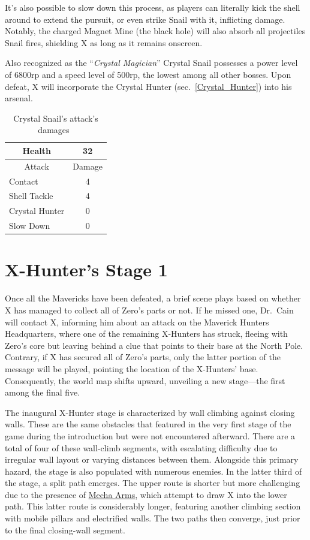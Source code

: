  It's also possible to slow down this process, as players can literally kick the shell around to extend the pursuit, or even strike Snail with it, inflicting damage. Notably, the charged Magnet Mine (the black hole) will also absorb all projectiles Snail fires, shielding X as long as it remains onscreen.

Also recognized as the ``\textit{Crystal Magician}'' Crystal Snail possesses a power level of 6800rp and a speed level of 500rp, the lowest among all other bosses. Upon defeat, X will incorporate the Crystal Hunter (sec.~\ref{Crystal_Hunter}) into his arsenal.
\begin{table}[htp]
	\centering
	\begin{tabular}[h]{l c}
		\toprule
		\multicolumn{1}{c}{Health}  & 32 \\
		\midrule
		\multicolumn{1}{c}{Attack} & \multicolumn{1}{c}{Damage}\\
		Contact & 4 \\
		Shell Tackle & 4\\
		Crystal Hunter & 0\\
		Slow Down & 0\\
		\bottomrule
	\end{tabular}
	\caption{Crystal Snail's attack's damages~\cite{wiki:Crystal_snail,book:Compendium}}
\end{table}

\section{X-Hunter's Stage 1}

Once all the Mavericks have been defeated, a brief scene plays based on whether X has managed to collect all of Zero's parts or not. If he missed one, Dr.~Cain will contact X, informing him about an attack on the Maverick Hunters Headquarters, where one of the remaining X-Hunters has struck, fleeing with Zero's core but leaving behind a clue that points to their base at the North Pole. Contrary, if X has secured all of Zero's parts, only the latter portion of the message will be played, pointing the location of the X-Hunters' base. Consequently, the world map shifts upward, unveiling a new stage—the first among the final five.

The inaugural X-Hunter stage is characterized by wall climbing against closing walls. These are the same obstacles that featured in the very first stage of the game during the introduction but were not encountered afterward. There are a total of four of these wall-climb segments, with escalating difficulty due to irregular wall layout or varying distances between them. Alongside this primary hazard, the stage is also populated with numerous enemies. In the latter third of the stage, a split path emerges. The upper route is shorter but more challenging due to the presence of \hyperlink{enem:Mecha-Arm}{Mecha Arms}, which attempt to draw X into the lower path. This latter route is considerably longer, featuring another climbing section with mobile pillars and electrified walls. The two paths then converge, just prior to the final closing-wall segment.

